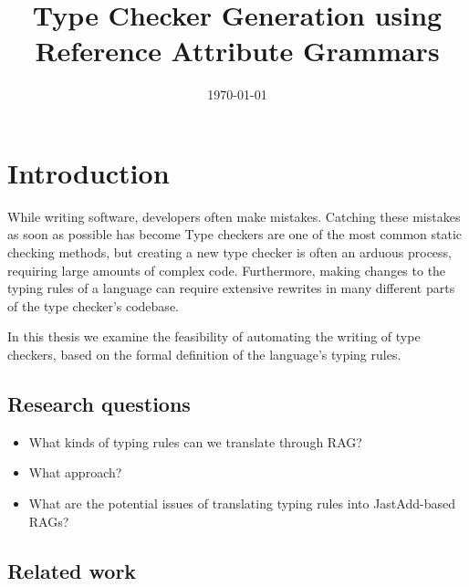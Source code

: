 \documentclass[nofilelist]{cslthse-msc}
\title{Type Checker Generation using Reference Attribute Grammars}
\date{\today}
\begin{document}
\renewcommand{\bibname}{References}

\makefrontmatter
\chapter{Introduction} %
While writing software, developers often make mistakes.
Catching these mistakes as soon as possible has become 
Type checkers are one of the most common static checking methods, but creating a new type checker is often an arduous process, requiring large amounts of complex code.
Furthermore, making changes to the typing rules of a language can require extensive rewrites in many different parts of the type checker's codebase.

In this thesis we examine the feasibility of automating the writing of type checkers, based on the formal definition of the language's typing rules.


\section{Research questions}
\begin{itemize}
  \item What kinds of typing rules can we translate through RAG?
  \item What approach?
  \item What are the potential issues of translating typing rules into JastAdd-based RAGs?
\end{itemize}

\section{Related work} %
\end{document}
